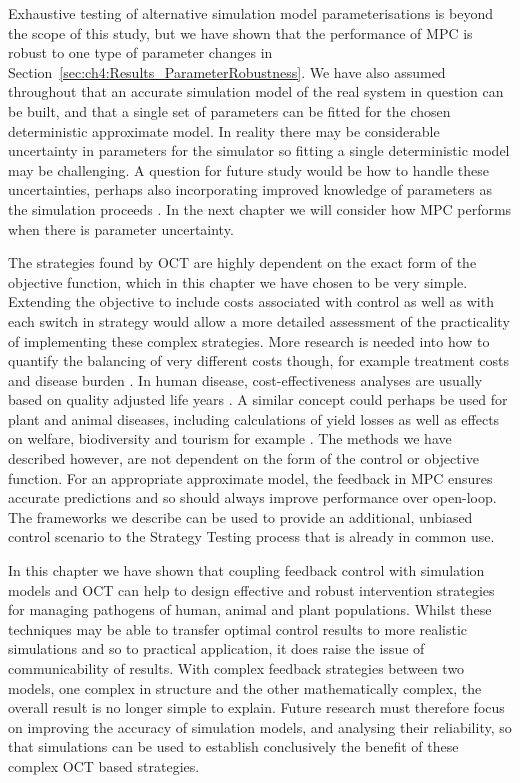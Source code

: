 Exhaustive testing of alternative simulation model parameterisations is beyond the scope of this study, but we have shown that the performance of MPC is robust to one type of parameter changes in Section~\ref{sec:ch4:Results_ParameterRobustness}. We have also assumed throughout that an accurate simulation model of the real system in question can be built, and that a single set of parameters can be fitted for the chosen deterministic approximate model. In reality there may be considerable uncertainty in parameters for the simulator so fitting a single deterministic model may be challenging. A question for future study would be how to handle these uncertainties, perhaps also incorporating improved knowledge of parameters as the simulation proceeds \citep{thompson_control_2018}. In the next chapter we will consider how MPC performs when there is parameter uncertainty.

The strategies found by OCT are highly dependent on the exact form of the objective function, which in this chapter we have chosen to be very simple. Extending the objective to include costs associated with control as well as with each switch in strategy would allow a more detailed assessment of the practicality of implementing these complex strategies. More research is needed into how to quantify the balancing of very different costs though, for example treatment costs and disease burden \citep{rowthorn_optimal_2009}. In human disease, cost-effectiveness analyses are usually based on quality adjusted life years \citep{whitehead_health_2010}. A similar concept could perhaps be used for plant and animal diseases, including calculations of yield losses \citep{savary_crop_2012, savary_global_2019} as well as effects on welfare, biodiversity and tourism for example \citep{boyd_consequence_2013}. The methods we have described however, are not dependent on the form of the control or objective function. For an appropriate approximate model, the feedback in MPC ensures accurate predictions and so should always improve performance over open-loop. The frameworks we describe can be used to provide an additional, unbiased control scenario to the Strategy Testing process that is already in common use.

In this chapter we have shown that coupling feedback control with simulation models and OCT can help to design effective and robust intervention strategies for managing pathogens of human, animal and plant populations. Whilst these techniques may be able to transfer optimal control results to more realistic simulations and so to practical application, it does raise the issue of communicability of results. With complex feedback strategies between two models, one complex in structure and the other mathematically complex, the overall result is no longer simple to explain. Future research must therefore focus on improving the accuracy of simulation models, and analysing their reliability, so that simulations can be used to establish conclusively the benefit of these complex OCT based strategies.

